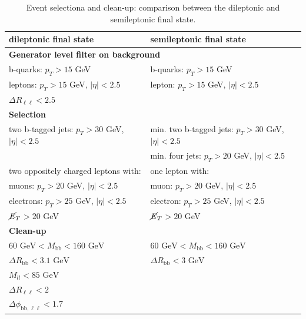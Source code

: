 \documentclass[10pt,a4paper]{article}
\newcommand{\levels}[1]{ \multicolumn{2}{l}{\hspace{-1em}\textbf{#1}}}
\newcommand{\T}{\rule{0pt}{2.9ex}}       %
\newcommand{\lnu}{$\ell\nu$}
\renewcommand{\ll}{\ell\ell}
\newcommand{\bb}{\text{bb}}
\newcommand{\MET}{$\cancel{\it{E}}_{T}$}
\begin{document}
\begin{table}[p]
	\centering
	\caption{Event selectiona and clean-up: comparison between the dileptonic and semileptonic final state.} \vspace{5pt}
	\label{cuts}
	\begin{tabular}{@{\quad}ll@{}}
	\toprule
	dileptonic final state                     &   semileptonic final state   \\
	\midrule
	\levels{Generator level filter on background} \T\\
	b-quarks: $p_T > 15$ GeV                      & b-quarks: $p_T > 15$ GeV    \\
	leptons: $p_T > 15$ GeV, $|\eta| < 2.5$       & lepton: $p_T > 15$ GeV, $|\eta| < 2.5$    \\
	$\Delta R_{\ll} < 2.5$                        & \\%
	\levels{Selection} \T\\
	two b-tagged jets: $p_T > 30$ GeV, $|\eta|<2.5$ & min. two b-tagged jets: $p_T > 30$ GeV, $|\eta|<2.5$ \\
	                                              & min. four jets: $p_T > 20$ GeV, $|\eta|<2.5$ \\
	two oppositely charged leptons with:          & one lepton with: \\
	\quad muons: $p_T > 20$ GeV, $|\eta|<2.5$     & \quad muon: $p_T > 20$ GeV, $|\eta|<2.5$ \\
	\quad electrons: $p_T > 25$ GeV, $|\eta|<2.5$ & \quad electron: $p_T > 25$ GeV, $|\eta|<2.5$ \\
	\MET $> 20$ GeV                                & \MET $> 20$ GeV \\
	\levels{Clean-up} \T\\
	$60 \text{ GeV} < M_{\bb} < 160 \text{ GeV}$  & $60 \text{ GeV} < M_{\bb} < 160 \text{ GeV}$ \\
	$\Delta R_{\bb} < 3.1 \text{ GeV}$            & $\Delta R_{\bb} < 3 \text{ GeV}$ \\
	$M_{ll} < 85 \text{ GeV}$                     & \\
	$\Delta R_{\ll} < 2$                          & \\
	$\Delta \phi_{\text{bb},\ll} < 1.7$           & \\
	
	\end{tabular}
\end{table}
\end{document}
